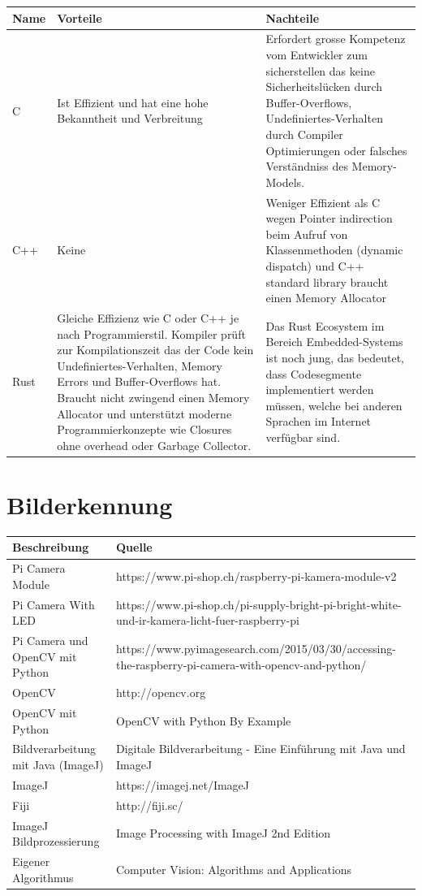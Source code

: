 \documentclass[a4paper]{report}
\begin{document}
\vspace{1em}
\noindent
\begin{tabular}{|p{}|p{}|p{}|}
  \hline
  \textbf{Name} & \textbf{Vorteile} & \textbf{Nachteile} \\
  \hline
  C & Ist Effizient und hat eine hohe Bekanntheit und Verbreitung & Erfordert grosse Kompetenz vom Entwickler zum sicherstellen das keine Sicherheitslücken durch Buffer-Overflows, Undefiniertes-Verhalten durch Compiler Optimierungen oder falsches Verständniss des Memory-Models. \\
  \hline
  C++ & Keine & Weniger Effizient als C wegen Pointer indirection beim Aufruf von Klassenmethoden (dynamic dispatch) und C++ standard library braucht einen Memory Allocator \\
  \hline
  Rust & Gleiche Effizienz wie C oder C++ je nach Programmierstil. Kompiler prüft zur Kompilationszeit das der Code kein Undefiniertes-Verhalten, Memory Errors und Buffer-Overflows hat. Braucht nicht zwingend einen Memory Allocator und unterstützt moderne Programmierkonzepte wie Closures ohne overhead oder Garbage Collector. & Das Rust Ecosystem im Bereich Embedded-Systems ist noch jung, das bedeutet, dass Codesegmente implementiert werden müssen, welche bei anderen Sprachen im Internet verfügbar sind.\\
  \hline
\end{tabular}

\section{Bilderkennung}

\vspace{1em}
\noindent
\begin{tabular}{|p{}|p{}|}
	\hline
	\textbf{Beschreibung} & \textbf{Quelle} \\
	\hline
	Pi Camera Module & https://www.pi-shop.ch/raspberry-pi-kamera-module-v2\\
	\hline
	Pi Camera With LED & https://www.pi-shop.ch/pi-supply-bright-pi-bright-white-und-ir-kamera-licht-fuer-raspberry-pi\\
	\hline
	Pi Camera und OpenCV mit Python & https://www.pyimagesearch.com/2015/03/30/accessing-the-raspberry-pi-camera-with-opencv-and-python/\\
	\hline
	OpenCV & http://opencv.org \\
	\hline
	OpenCV mit Python & OpenCV with Python By Example \\
	\hline
	Bildverarbeitung mit Java (ImageJ) & Digitale Bildverarbeitung - Eine Einführung mit Java und ImageJ\\
	\hline
	ImageJ & https://imagej.net/ImageJ \\
	\hline
	Fiji & http://fiji.sc/ \\
	\hline
	ImageJ Bildprozessierung & Image Processing with ImageJ 2nd Edition \\
	\hline
	Eigener Algorithmus & Computer Vision: Algorithms and Applications\\
	\hline
\end{tabular}
\end{document}
